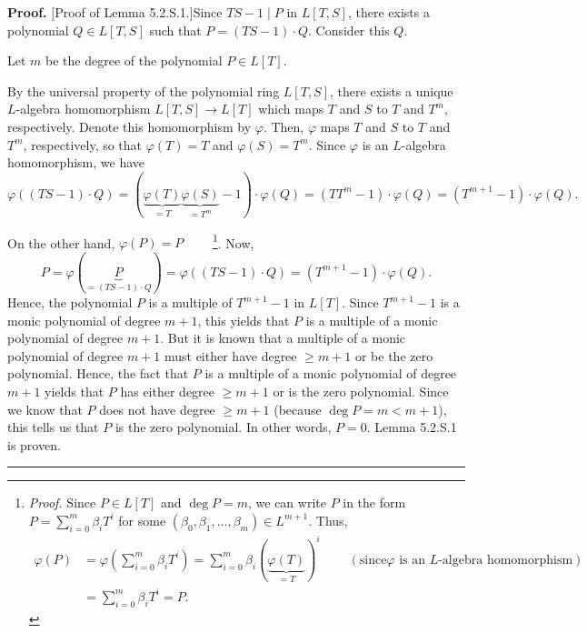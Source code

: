 \documentclass[numbers=enddot,12pt,final,onecolumn,notitlepage]{scrartcl}%
\newenvironment{proof}[1][Proof]{\noindent\textbf{#1.} }{\ \rule{0.5em}{0.5em}}
\begin{document}
\begin{proof}
[Proof of Lemma 5.2.S.1.]Since $TS-1\mid P$ in $L\left[  T,S\right]  $, there
exists a polynomial $Q\in L\left[  T,S\right]  $ such that $P=\left(
TS-1\right)  \cdot Q$. Consider this $Q$.

Let $m$ be the degree of the polynomial $P\in L\left[  T\right]  $.

By the universal property of the polynomial ring $L\left[  T,S\right]  $,
there exists a unique $L$-algebra homomorphism $L\left[  T,S\right]
\rightarrow L\left[  T\right]  $ which maps $T$ and $S$ to $T$ and $T^{m}$,
respectively. Denote this homomorphism by $\varphi$. Then, $\varphi$ maps $T$
and $S$ to $T$ and $T^{m}$, respectively, so that $\varphi\left(  T\right)
=T$ and $\varphi\left(  S\right)  =T^{m}$. Since $\varphi$ is an $L$-algebra
homomorphism, we have
\[
\varphi\left(  \left(  TS-1\right)  \cdot Q\right)  =\left(
\underbrace{\varphi\left(  T\right)  }_{=T}\underbrace{\varphi\left(
S\right)  }_{=T^{m}}-1\right)  \cdot\varphi\left(  Q\right)  =\left(
TT^{m}-1\right)  \cdot\varphi\left(  Q\right)  =\left(  T^{m+1}-1\right)
\cdot\varphi\left(  Q\right)  .
\]


On the other hand, $\varphi\left(  P\right)  =P$%
\ \ \ \ \footnote{\textit{Proof.} Since $P\in L\left[  T\right]  $ and $\deg
P=m$, we can write $P$ in the form $P=\sum\limits_{i=0}^{m}\beta_{i}T^{i}$ for
some $\left(  \beta_{0},\beta_{1},...,\beta_{m}\right)  \in L^{m+1}$. Thus,%
\begin{align*}
\varphi\left(  P\right)   &  =\varphi\left(  \sum\limits_{i=0}^{m}\beta
_{i}T^{i}\right)  =\sum\limits_{i=0}^{m}\beta_{i}\left(  \underbrace{\varphi
\left(  T\right)  }_{=T}\right)  ^{i}\ \ \ \ \ \ \ \ \ \ \left(  \text{since
}\varphi\text{ is an }L\text{-algebra homomorphism}\right) \\
&  =\sum\limits_{i=0}^{m}\beta_{i}T^{i}=P.
\end{align*}
}. Now,%
\[
P=\varphi\left(  \underbrace{P}_{=\left(  TS-1\right)  \cdot Q}\right)
=\varphi\left(  \left(  TS-1\right)  \cdot Q\right)  =\left(  T^{m+1}%
-1\right)  \cdot\varphi\left(  Q\right)  .
\]
Hence, the polynomial $P$ is a multiple of $T^{m+1}-1$ in $L\left[  T\right]
$. Since $T^{m+1}-1$ is a monic polynomial of degree $m+1$, this yields that
$P$ is a multiple of a monic polynomial of degree $m+1$. But it is known that
a multiple of a monic polynomial of degree $m+1$ must either have degree $\geq
m+1$ or be the zero polynomial. Hence, the fact that $P$ is a multiple of a
monic polynomial of degree $m+1$ yields that $P$ has either degree $\geq m+1$
or is the zero polynomial. Since we know that $P$ does not have degree $\geq
m+1$ (because $\deg P=m<m+1$), this tells us that $P$ is the zero polynomial.
In other words, $P=0$. Lemma 5.2.S.1 is proven.
\end{proof}
\end{document}

